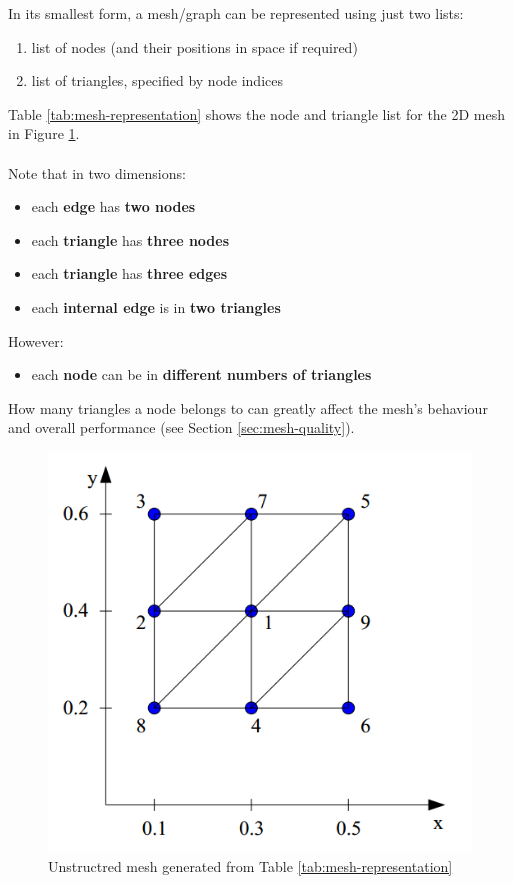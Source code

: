 \documentclass{article}
\begin{document}
In its smallest form, a mesh/graph can be represented using just two lists:
\begin{enumerate}
	\item list of nodes (and their positions in space if required)
	\item list of triangles, specified by node indices
\end{enumerate}

Table \ref{tab:mesh-representation} shows the node and triangle list for the 2D mesh in Figure \ref{fig:mesh-representation}.

\paragraph{}

Note that in two dimensions:
\begin{itemize}
	\item each \textbf{edge} has \textbf{two nodes}
	\item each \textbf{triangle} has \textbf{three nodes}
	\item each \textbf{triangle} has \textbf{three edges}
	\item each \textbf{internal edge} is in \textbf{two triangles}
\end{itemize}
However:
\begin{itemize}
	\item each \textbf{node} can be in \textbf{different numbers of triangles}
\end{itemize}
How many triangles a node belongs to can greatly affect the mesh's behaviour and overall performance (see Section \ref{sec:mesh-quality}).

\begin{figure}
	\centering
	\includegraphics[scale=0.4]{figures/unstructured-mesh-example.png}
	\caption{Unstructred mesh generated from Table \ref{tab:mesh-representation}}
	\label{fig:mesh-representation}
\end{figure}
\end{document}
